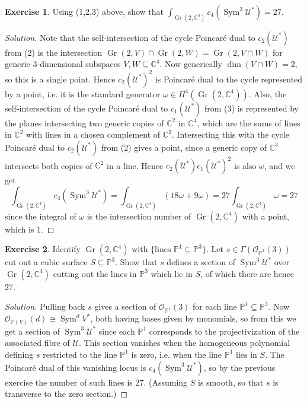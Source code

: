 \documentclass{article}
\theoremstyle{definition}
\newtheorem*{exercise}{Exercise}
\DeclareMathOperator{\Gr}{Gr}
\DeclareMathOperator{\Sym}{Sym}
\renewcommand{\O}{\mathcal{O}}
\newcommand{\U}{\mathcal{U}}
\renewcommand{\P}{\mathbb{P}}
\newcommand{\C}{\mathbb{C}}
\begin{document}
\begin{exercise}
    Using (1,2,3) above, show that $\int_{\Gr(2,\C^4)}c_4(\Sym^3\U^*)=27$.
\end{exercise}

\begin{proof}[Solution]
    Note that the self-intersection of the cycle Poincar\'e dual to $c_2(\U^*)$
    from (2) is the intersection $\Gr(2,V)\cap\Gr(2,W)=\Gr(2,V\cap W)$ for
    generic 3-dimensional subspaces $V,W\subseteq\C^4$. Now generically
    $\dim(V\cap W)=2$, so this is a single point. Hence $c_2(\U^*)^2$ is
    Poincar\'e dual to the cycle represented by a point, i.e. it is the standard
    generator $\omega\in H^4(\Gr(2,\C^4))$. Also, the self-intersection of the
    cycle Poincar\'e dual to $c_1(\U^*)$ from (3) is represented by the planes
    intersecting two generic copies of $\C^2$ in $\C^4$, which are the sums of
    lines in $\C^2$ with lines in a chosen complement of $\C^2$. Intersecting
    this with the cycle Poincar\'e dual to $c_2(\U^*)$ from (2) gives a point,
    since a generic copy of $\C^3$ intersects both copies of $\C^2$ in a line.
    Hence $c_2(\U^*)c_1(\U^*)^2$ is also $\omega$, and we get
    \begin{equation*}
        \int_{\Gr(2,\C^4)}c_4(\Sym^3\U^*)
            = \int_{\Gr(2,\C^4)}(18\omega+9\omega)
            = 27\int_{\Gr(2,\C^4)}\omega
            = 27
    \end{equation*}
    since the integral of $\omega$ is the intersection number of $\Gr(2,\C^4)$
    with a point, which is 1.
\end{proof}

\begin{exercise}
    Identify $\Gr(2,\C^4)$ with $\{\text{lines $\P^1\subseteq\P^3$}\}$. Let
    $s\in\Gamma(\O_{\P^3}(3))$ cut out a cubic surface $S\subseteq\P^3$. Show
    that $s$ defines a section of $\Sym^3\U^*$ over $\Gr(2,\C^4)$ cutting out
    the lines in $\P^3$ which lie in $S$, of which there are hence 27.
\end{exercise}

\begin{proof}[Solution]
    Pulling back $s$ gives a section of $\O_{\P^1}(3)$ for each line
    $\P^1\subseteq\P^3$. Now $\O_{\P(V)}(d)\cong\Sym^dV^*$, both having bases
    given by monomials, so from this we get a section of $\Sym^3\U^*$ since each
    $\P^1$ corresponds to the projectivization of the associated fibre of $\U$.
    This section vanishes when the homogeneous polynomial defining $s$
    restricted to the line $\P^1$ is zero, i.e. when the line $\P^1$ lies in
    $S$. The Poincar\'e dual of this vanishing locus is $c_4(\Sym^3\U^*)$, so by
    the previous exercise the number of such lines is 27. (Assuming $S$ is
    smooth, so that $s$ is transverse to the zero section.)
\end{proof}
\end{document}
